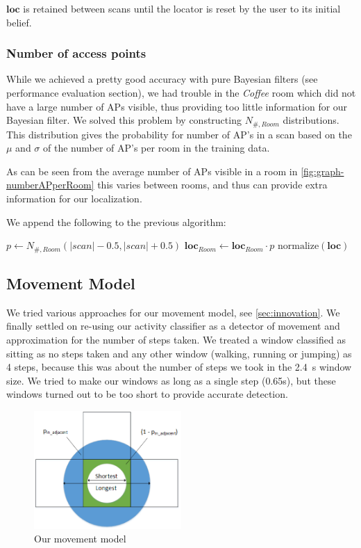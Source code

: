 \documentclass[a4paper,10pt,twoside]{IEEEtran}
\begin{document}
$\mathbf{loc}$ is retained between scans until the locator is reset by the user to its initial belief.

\subsubsection{Number of access points}
\label{subsec:loc-numap}

While we achieved a pretty good accuracy with pure Bayesian filters (see performance evaluation section), we had trouble in the \emph{Coffee} room which did not have a large number of APs visible, thus providing too little information for our Bayesian filter.
We solved this problem by constructing $N_{\#,Room}$ distributions.
This distribution gives the probability for number of AP's in a scan based on the $\mu$ and $\sigma$ of the number of AP's per room in the training data.

As can be seen from the average number of APs visible in a room in \autoref{fig:graph-numberAPperRoom} this varies between rooms, and thus can provide extra information for our localization.

We append the following to the previous algorithm:
\\
\begin{algorithmic}
			\State $p \gets N_{\#,Room}(|scan|-0.5,|scan|+0.5)$
			\State $\mathbf{loc}_{Room} \gets \mathbf{loc}_{Room} \cdot p $
		\EndFor
		\State $\text{normalize}\left(\mathbf{loc}\right)$
	\EndIf
\end{algorithmic}

\subsection{Movement Model}
\label{sec:loc-movement-model}

We tried various approaches for our movement model, see \autoref{sec:innovation}.
We finally settled on re-using our activity classifier as a detector of movement and approximation for the number of steps taken. 
We treated a window classified as sitting as no steps taken and any other window (walking, running or jumping) as 4 steps, because this was about the number of steps we took in the 2.4~s window size.
We tried to make our windows as long as a single step (0.65s), but these windows turned out to be too short to provide accurate detection.

\begin{figure}
  \centering
    \includegraphics[width=0.5\textwidth]{movementmodel}
    \caption{Our movement model}
    \label{fig:movementmodel}
\end{figure}
\end{document}
